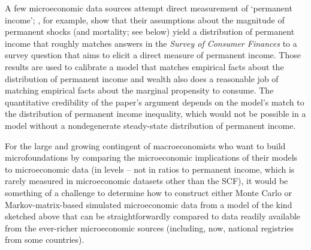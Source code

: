 \documentclass[ProjectDLO]{subfiles}
\begin{document}
\begin{comment}
The problem is not with the growth factor $\PGro$; the same point would hold with $\PGro=1$, in which case the proposition would become
\begin{align}
    \cv(\cRat_{t+1},\pLevBF_{t+1})   & = \cv(\cRat_{t},\pLevBF_{t}) \label{eq:covSolnStable} .
\end{align}
\end{comment}

A few microeconomic data sources attempt direct measurement of `permanent income'; \cite{cstwMPC}, for example, show that their assumptions about the magnitude of permanent shocks (and mortality; see below) yield a distribution of permanent income that roughly matches answers in the \emph{Survey of Consumer Finances} to a survey question that aims to elicit a direct measure of permanent income.  Those results are used to calibrate a model that matches empirical facts about the distribution of permanent income and wealth also does a reasonable job of matching empirical facts about the marginal propensity to consume.  The quantitative credibility of the paper's argument depends on the model's match to the distribution of permanent income inequality, which would not be possible in a model without a nondegenerate steady-state distribution of permanent income.

For the large and growing contingent of macroeconomists who want to build microfoundations by comparing the microeconomic implications of their models to microeconomic data (in levels -- not in ratios to permanent income, which is rarely measured in microeconomic datasets other than the SCF), it would be something of a challenge to determine how to construct either Monte Carlo or Markov-matrix-based simulated microeconomic data from a model of the kind sketched above that can be straightforwardly compared to data readily available from the ever-richer microeconomic sources (including, now, national registries from some countries).  %
\end{document}
